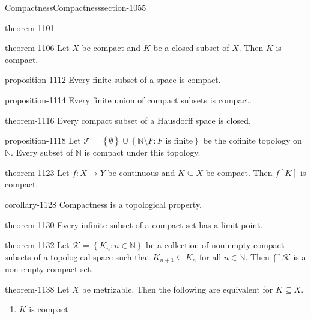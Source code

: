 \documentclass[oneside,10pt,]{article}
\newcommand{\mb}{\mathbb}
\newcommand{\mc}{\mathcal}
\newcommand{\setBuilder}[2]{\left\{#1:#2\right\}}
\newcommand{\setList}[1]{\left\{#1\right\}}
\begin{document}
\begin{sectionptx}{Compactness}{}{Compactness}{}{}{section-1055}
\begin{theorem}{}{}{theorem-1101}
\end{theorem}
\begin{theorem}{}{}{theorem-1106}%
\hypertarget{p-1107}{}%
Let \(X\) be compact and \(K\) be a closed subset of \(X\). Then \(K\) is compact.%
\end{theorem}
\begin{proposition}{}{}{proposition-1112}%
\hypertarget{p-1113}{}%
Every finite subset of a space is compact.%
\end{proposition}
\begin{proposition}{}{}{proposition-1114}%
\hypertarget{p-1115}{}%
Every finite union of compact subsets is compact.%
\end{proposition}
\begin{theorem}{}{}{theorem-1116}%
\hypertarget{p-1117}{}%
Every compact subset of a Hausdorff space is closed.%
\end{theorem}
\begin{proposition}{}{}{proposition-1118}%
\hypertarget{p-1119}{}%
Let \(\mc T=\setList{\emptyset}\cup
\setBuilder{\mb N\setminus F}{F\text{ is finite}}\) be the cofinite topology on \(\mb N\). Every subset of \(\mb N\) is compact under this topology.%
\end{proposition}
\begin{theorem}{}{}{theorem-1123}%
\hypertarget{p-1124}{}%
Let \(f:X\to Y\) be continuous and \(K\subseteq X\) be compact. Then \(f[K]\) is compact.%
\end{theorem}
\begin{corollary}{}{}{corollary-1128}%
\hypertarget{p-1129}{}%
Compactness is a topological property.%
\end{corollary}
\begin{theorem}{}{}{theorem-1130}%
\hypertarget{p-1131}{}%
Every infinite subset of a compact set has a limit point.%
\end{theorem}
\begin{theorem}{}{}{theorem-1132}%
\hypertarget{p-1133}{}%
Let \(\mc K=\setBuilder{K_n}{n\in\mb N}\) be a collection of non-empty compact subsets of a topological space such that \(K_{n+1}\subseteq K_n\) for all \(n\in\mb N\). Then \(\bigcap\mc K\) is a non-empty compact set.%
\end{theorem}
\begin{theorem}{}{}{theorem-1138}%
\hypertarget{p-1139}{}%
Let \(X\) be metrizable. Then the following are equivalent for \(K\subseteq X\).%
\leavevmode%
\begin{enumerate}
\item\hypertarget{li-1143}{}\(K\) is compact%

\end{enumerate}
\end{theorem}
\end{sectionptx}
\end{document}
